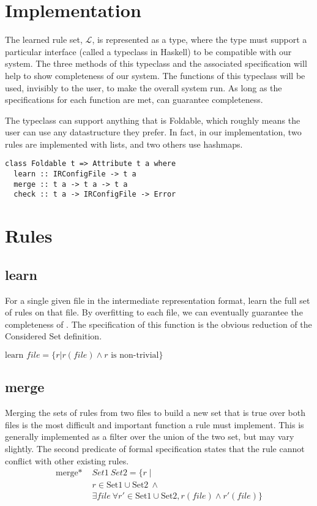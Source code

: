 \section{Implementation}

The learned rule set, $\mathcal{L}$, is represented as a type, where the type must support a particular interface (called a typeclass in Haskell) to be compatible with our system.
The three methods of this typeclass and the associated specification will help to show completeness of our system.
The functions of this typeclass will be used, invisibly to the user, to make the overall system run.
As long as the specifications for each function are met, \app can guarantee completeness.

The typeclass can support anything that is Foldable, which roughly means the user can use any datastructure they prefer.
In fact, in our implementation, two rules are implemented with lists, and two others use hashmaps.

\begin{lstlisting}
class Foldable t => Attribute t a where
  learn :: IRConfigFile -> t a
  merge :: t a -> t a -> t a
  check :: t a -> IRConfigFile -> Error
\end{lstlisting}

\section{Rules}

\subsection{learn}
  For a single given file in the intermediate representation format, learn the full set of rules on that file.
  By overfitting to each file, we can eventually guarantee the completeness of \app.
  The specification of this function is the obvious reduction of the Considered Set definition.

  $\text{learn } file =  \{ r | r(file) \land r \text{ is non-trivial}\}$

\subsection{merge}
  Merging the sets of rules from two files to build a new set that is true over both files is the most difficult and important function a rule must implement.
  This is generally implemented as a filter over the union of the two set, but may vary slightly.
  The second predicate of formal specification states that the rule cannot conflict with other existing rules.
  \begin{align*}
  \text{merge* }& Set1 \: Set2= \{r \mid \\
    & r \in \text{Set1} \cup \text{Set2}\ \land \\
    & \exists file\ \forall r' \in \text{Set1} \cup \text{Set2}, r(file) \land r'(file) \} \\
  \end{align*}

